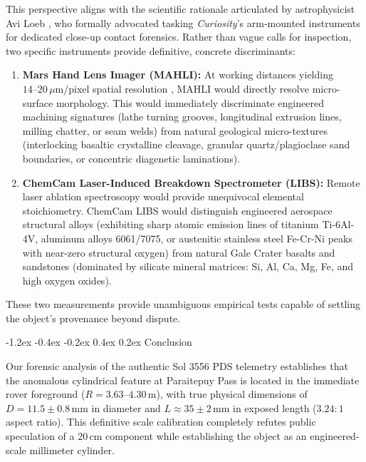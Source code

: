 \documentclass[11pt,a4paper]{article}
\makeatletter
\renewcommand\section{\@startsection {section}{1}{\z@}%
                                   {-1.2ex \@plus -0.4ex \@minus -0.2ex}%
                                   {0.4ex \@plus 0.2ex}%
                                   {\normalfont\large\bfseries}}
\makeatother
\begin{document}
This perspective aligns with the scientific rationale articulated by astrophysicist Avi Loeb \cite{loeb2026}, who formally advocated tasking \textit{Curiosity}'s arm-mounted instruments for dedicated close-up contact forensics. Rather than vague calls for inspection, two specific instruments provide definitive, concrete discriminants:
\begin{enumerate}
	\item \textbf{Mars Hand Lens Imager (MAHLI):} At working distances yielding $14\text{--}20\,\mu\text{m/pixel}$ spatial resolution \cite{edgett2012}, MAHLI would directly resolve micro-surface morphology. This would immediately discriminate engineered machining signatures (lathe turning grooves, longitudinal extrusion lines, milling chatter, or seam welds) from natural geological micro-textures (interlocking basaltic crystalline cleavage, granular quartz/plagioclase sand boundaries, or concentric diagenetic laminations).
	\item \textbf{ChemCam Laser-Induced Breakdown Spectrometer (LIBS):} Remote laser ablation spectroscopy \cite{wiens2012} would provide unequivocal elemental stoichiometry. ChemCam LIBS would distinguish engineered aerospace structural alloys (exhibiting sharp atomic emission lines of titanium Ti-6Al-4V, aluminum alloys 6061/7075, or austenitic stainless steel Fe-Cr-Ni peaks with near-zero structural oxygen) from natural Gale Crater basalts and sandstones (dominated by silicate mineral matrices: Si, Al, Ca, Mg, Fe, and high oxygen oxides).
\end{enumerate}
These two measurements provide unambiguous empirical tests capable of settling the object's provenance beyond dispute.

\section{Conclusion}

Our forensic analysis of the authentic Sol 3556 PDS telemetry establishes that the anomalous cylindrical feature at Paraitepuy Pass is located in the immediate rover foreground ($R = 3.63\text{--}4.30\,\text{m}$), with true physical dimensions of $D = 11.5 \pm 0.8\,\text{mm}$ in diameter and $L \approx 35 \pm 2\,\text{mm}$ in exposed length ($3.24:1$ aspect ratio). This definitive scale calibration completely refutes public speculation of a $20\,\text{cm}$ component while establishing the object as an engineered-scale millimeter cylinder.
\end{document}
